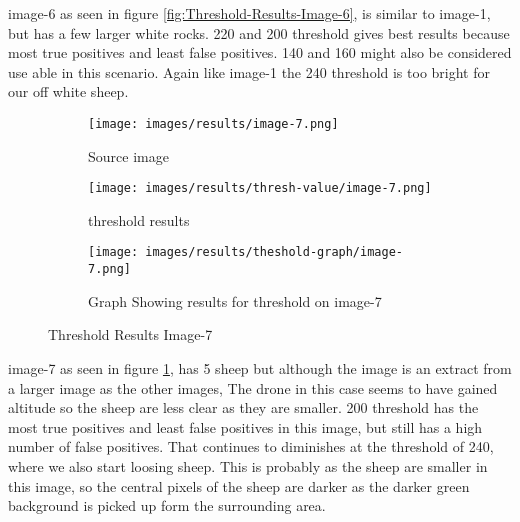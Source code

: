 image-6 as seen in figure \ref{fig:Threshold-Results-Image-6}, is similar to image-1, but has a few larger white rocks. 220 and 200 threshold gives best results because most true positives and least false positives. 140 and 160 might also be considered use able in this scenario. Again like image-1 the 240 threshold is too bright for our off white sheep.

\begin{figure}[H]
    \centering

\begin{subfigure}{.5\textwidth}
    \centering
    \texttt{[image: images/results/image-7.png]}
    \caption{Source image}

\end{subfigure}%
\begin{subfigure}{.5\textwidth}
\centering
    \texttt{[image: images/results/thresh-value/image-7.png]}
    \caption{threshold results}

\end{subfigure}
\begin{subfigure}{.9\textwidth}
\centering
    \texttt{[image: images/results/theshold-graph/image-7.png]}
    \caption{Graph Showing results for threshold on image-7}
\end{subfigure}%

    \caption{Threshold Results Image-7}
    \label{fig:Threshold-Results-Image-7}
\end{figure}

image-7 as seen in figure \ref{fig:Threshold-Results-Image-7}, has 5 sheep but although the image is an extract from a larger image as the other images, The drone in this case seems to have gained altitude so the sheep are less clear as they are smaller. 200 threshold has the most true positives and least false positives in this image, but still has a high number of false positives. That continues to diminishes at the threshold of 240, where we also start loosing sheep. This is probably as the sheep are smaller in this image, so the central pixels of the sheep are darker as the darker green background is picked up form the surrounding area.

